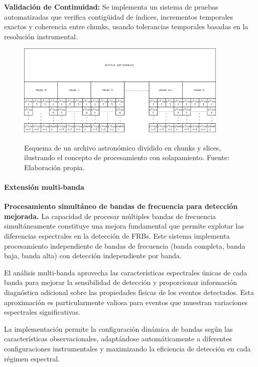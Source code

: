 \textbf{Validación de Continuidad:} Se implementa un sistema de pruebas automatizadas que verifica contigüidad de índices, incrementos temporales exactos y coherencia entre chunks, usando tolerancias temporales basadas en la resolución instrumental.

\begin{figure}[H]
\centering
\includegraphics[width=0.9\textwidth]{figures/sistema-chunks.png}
\caption{Esquema de un archivo astronómico dividido en chunks y slices, ilustrando el concepto de procesamiento con solapamiento. Fuente: Elaboración propia.}
\label{fig:sistema-chunks}
\end{figure}

\paragraph{Extensión multi-banda}

\noindent\textbf{Procesamiento simultáneo de bandas de frecuencia para detección mejorada.} La capacidad de procesar múltiples bandas de frecuencia simultáneamente constituye una mejora fundamental que permite explotar las diferencias espectrales en la detección de FRBs. Este sistema implementa procesamiento independiente de bandas de frecuencia (banda completa, banda baja, banda alta) con detección independiente por banda.

El análisis multi-banda aprovecha las características espectrales únicas de cada banda para mejorar la sensibilidad de detección y proporcionar información diagnóstica adicional sobre las propiedades físicas de los eventos detectados. Esta aproximación es particularmente valiosa para eventos que muestran variaciones espectrales significativas.

La implementación permite la configuración dinámica de bandas según las características observacionales, adaptándose automáticamente a diferentes configuraciones instrumentales y maximizando la eficiencia de detección en cada régimen espectral.

